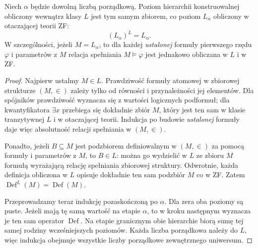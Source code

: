 \begin{lemat}
\label{lem:l-hierarchy-internal}
Niech $\alpha$ będzie dowolną liczbą porządkową. Poziom hierarchii
konstruowalnej obliczony wewnątrz klasy $L$ jest tym samym zbiorem,
co poziom $L_\alpha$ obliczony w otaczającej teorii ZF:
\[
 (L_\alpha)^L=L_\alpha.
\]
W szczególności, jeżeli $M=L_\alpha$, to dla każdej \emph{ustalonej}
formuły pierwszego rzędu $\varphi$ i parametrów z $M$ relacja
spełniania $M\models\varphi$ jest jednakowo obliczana w $L$ i w ZF.
\end{lemat}
\begin{proof}
Najpierw ustalmy $M\in L$. Prawdziwość formuły atomowej
w zbiorowej strukturze $(M,\in)$ zależy tylko od równości
i przynależności jej elementów. Dla spójników prawdziwość
wyznacza się z wartości logicznych podformuł; dla kwantyfikatora
$\exists x$ przebiega się dokładnie zbiór $M$, który jest ten sam
w klasie tranzytywnej $L$ i w otaczającej teorii. Indukcja
po budowie \emph{ustalonej} formuły daje więc absolutność
relacji spełniania w $(M,\in)$.

Ponadto, jeżeli $B\subseteq M$ jest podzbiorem definiowalnym
w $(M,\in)$ za pomocą formuły i parametrów z $M$, to
$B\in L$: można go wydzielić w $L$ ze zbioru $M$ formułą
wyrażającą relację spełniania zbiorowej struktury.
Odwrotnie, każda definicja obliczona w $L$ opisuje dokładnie
ten sam podzbiór $M$ co w ZF. Zatem
$\operatorname{Def}^L(M)=\operatorname{Def}(M)$.

Przeprowadzamy teraz indukcję pozaskończoną po $\alpha$.
Dla zera oba poziomy są puste. Jeżeli mają tę samą wartość
na etapie $\alpha$, to w kroku następnym wyznacza je ten sam
operator $\operatorname{Def}$. Na etapie granicznym obie
hierarchie biorą sumę tej samej rodziny wcześniejszych
poziomów. Każda liczba porządkowa należy do $L$, więc
indukcja obejmuje wszystkie liczby porządkowe zewnętrznego
uniwersum.
\end{proof}

